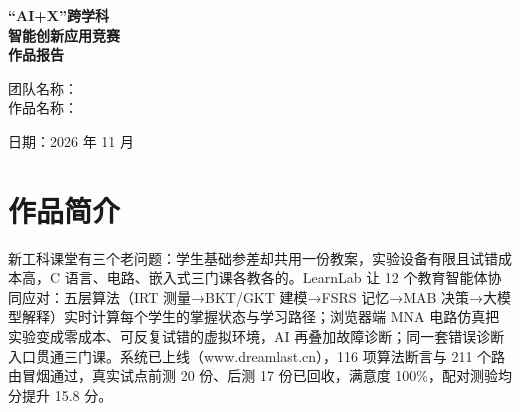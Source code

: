 \documentclass[zihao=-4,a4paper,UTF8,fontset=windows]{ctexart}
\begin{document}
\begin{titlepage}
\thispagestyle{cover}
\vspace*{2.8cm}
\begin{center}
{\bfseries{} “AI+X”跨学科}\\[0.8em]
{\bfseries{} 智能创新应用竞赛}\\[3em]
{\bfseries{} 作品报告}\\
\end{center}
\vspace{5em}
\begin{flushleft}
\hspace*{4em}
团队名称：\underline{}\\[0.8em]
\hspace*{4em}作品名称：\underline{}\\
\end{flushleft}
\vfill
\begin{center} 日期：2026 年 11 月\end{center}
\vspace*{1.5cm}
\end{titlepage}
\setcounter{page}{1}
\begingroup
{}
\renewcommand{\contentsname}{目\quad 录}
\setcounter{tocdepth}{3}
\tableofcontents
\endgroup
\newpage
\section*{作品简介}


新工科课堂有三个老问题：学生基础参差却共用一份教案，实验设备有限且试错成本高，C 语言、电路、嵌入式三门课各教各的。LearnLab 让 12 个教育智能体协同应对：五层算法（IRT 测量→BKT/GKT 建模→FSRS 记忆→MAB 决策→大模型解释）实时计算每个学生的掌握状态与学习路径；浏览器端 MNA 电路仿真把实验变成零成本、可反复试错的虚拟环境，AI 再叠加故障诊断；同一套错误诊断入口贯通三门课。系统已上线（www.dreamlast.cn），116 项算法断言与 211 个路由冒烟通过，真实试点前测 20 份、后测 17 份已回收，满意度 100\%，配对测验均分提升 15.8 分。
\end{document}
